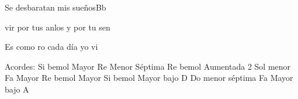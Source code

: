 \documentclass[12pt, spanish]{book}
\begin{document}
\begin{song}{Se desbaratan mis sueños}{Bb}
\begin{SBOpGroup}
            vir por tus anlos y por tu sen

            Es como ro cada día yo vi
        \end{SBOpGroup}


        \ifChordBk
        \begin{SBOpGroup}
            Acordes:\null\break
            \upchord{\Bflat}\qquad Si bemol Mayor \hfill
            \upchord{\Dmseven}\qquad Re Menor S\'eptima \hfill\null\break
            \upchord{\Eflattwo}Re bemol Aumentada 2 \hfill
            \upchord{\Gm}Sol menor \hfill\null\break
            \upchord{\F}\qquad Fa Mayor \hfill
            \upchord{\Eflat}Re bemol Mayor \hfill\null\break
            \upchord{\BflatD}\qquad Si bemol Mayor bajo D \hfill
            \upchord{\Cmseven}Do menor s\'eptima \hfill\null\break
            \upchord{\FA}Fa Mayor bajo A \hfill\null\break
        \end{SBOpGroup}
        \fi
    \end{song}
\end{document}
